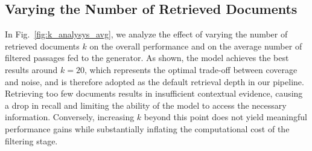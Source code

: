 \begin{table}[t]
\caption{VQA accuracy scores on the Encyclopedic-VQA test set with Google Lens employed as retriever.}
\label{tab:results_lens}
  \vspace{-0.2cm}
  \centering
  \setlength{\tabcolsep}{.5em}
\vspace{-0.35cm}
\end{table}

\subsection{Varying the Number of Retrieved Documents}
In Fig.~\ref{fig:k_analysys_avg}, we analyze the effect of varying the number of retrieved documents $k$ on the overall performance and on the average number of filtered passages fed to the generator. As shown, the model achieves the best results around $k=20$, which represents the optimal trade-off between coverage and noise, and is therefore adopted as the default retrieval depth in our pipeline. Retrieving too few documents results in insufficient contextual evidence, causing a drop in recall and limiting the ability of the model to access the necessary information. Conversely, increasing $k$ beyond this point does not yield meaningful performance gains while substantially inflating the computational cost of the filtering stage. 

